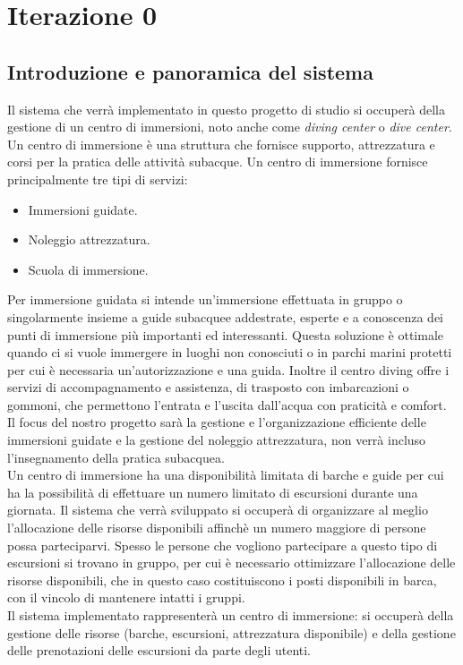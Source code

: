 \section{Iterazione 0}
\subsection{Introduzione e panoramica del sistema}
Il sistema che verrà implementato in questo progetto di studio si occuperà della gestione di un centro di immersioni, noto anche come \emph{diving center} o \emph{dive center}. Un centro di immersione è una struttura che fornisce supporto, attrezzatura e corsi per la pratica delle attività subacque. Un centro di immersione fornisce principalmente tre tipi di servizi:
\begin{itemize}
    \item Immersioni guidate.
    \item Noleggio attrezzatura.
    \item Scuola di immersione.
\end{itemize}
Per immersione guidata si intende un'immersione effettuata in gruppo o singolarmente insieme a guide subacquee addestrate, esperte e a conoscenza dei punti di immersione più importanti ed interessanti. Questa soluzione è ottimale quando ci si vuole immergere in luoghi non conosciuti o in parchi marini protetti per cui è necessaria un'autorizzazione e una guida. Inoltre il centro diving offre i servizi di accompagnamento e assistenza, di trasposto con imbarcazioni o gommoni, che permettono l'entrata e l'uscita dall'acqua con praticità e comfort.
\\
Il focus del nostro progetto sarà la gestione e l'organizzazione efficiente delle immersioni guidate e la gestione del noleggio attrezzatura, non verrà incluso l'insegnamento della pratica subacquea.
\\
Un centro di immersione ha una disponibilità limitata di barche e guide per cui ha la possibilità di effettuare un numero limitato di escursioni durante una giornata. Il sistema che verrà sviluppato si occuperà di organizzare al meglio l'allocazione delle risorse disponibili affinchè un numero maggiore di persone possa parteciparvi. Spesso le persone che vogliono partecipare a questo tipo di escursioni si trovano in gruppo, per cui è necessario ottimizzare l'allocazione delle risorse disponibili, che in questo caso costituiscono i posti disponibili in barca, con il vincolo di mantenere intatti i gruppi.
\\
Il sistema implementato rappresenterà un centro di immersione: si occuperà della gestione delle risorse (barche, escursioni, attrezzatura disponibile) e della gestione delle prenotazioni delle escursioni da parte degli utenti.
